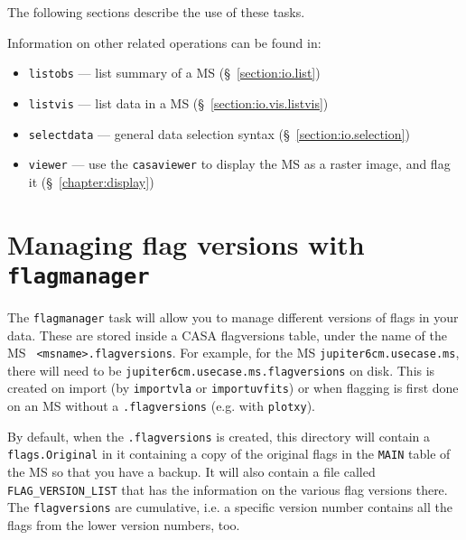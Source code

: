 The following sections describe the use of these tasks.

Information on other related operations can be found in:
\begin{itemize}
   \item {\tt listobs} --- list summary of a MS (\S~\ref{section:io.list})
   \item {\tt listvis} --- list data in a MS (\S~\ref{section:io.vis.listvis})
   \item {\tt selectdata} --- general data selection syntax
      (\S~\ref{section:io.selection})
   \item {\tt viewer} --- use the {\tt casaviewer} to display the MS as a 
      raster image, and flag it (\S~\ref{chapter:display})

\end{itemize}

\section{Managing flag versions with {\tt flagmanager}}
\label{section:edit.flagmanager}

The {\tt flagmanager} task will allow you to manage different
versions of flags in your data.  These are stored inside a CASA
flagversions table, under the name of the MS {\tt
  <msname>.flagversions}. 
For example, for the MS {\tt jupiter6cm.usecase.ms}, there will need
to be {\tt jupiter6cm.usecase.ms.flagversions} on disk.  This is
created on import (by {\tt importvla} or {\tt importuvfits}) or
when flagging is first done on an MS without a {\tt .flagversions}
(e.g. with {\tt plotxy}).  

By default, when the {\tt .flagversions} is created, this
directory will contain a {\tt flags.Original} in it containing
a copy of the original flags in the {\tt MAIN} table of the MS
so that you have a backup.  It will also contain a file called
{\tt FLAG\_VERSION\_LIST} that has the information on the various
flag versions there. The {\tt flagversions} are cumulative, i.e. a
specific version number contains all the flags from the lower version
numbers, too. 

